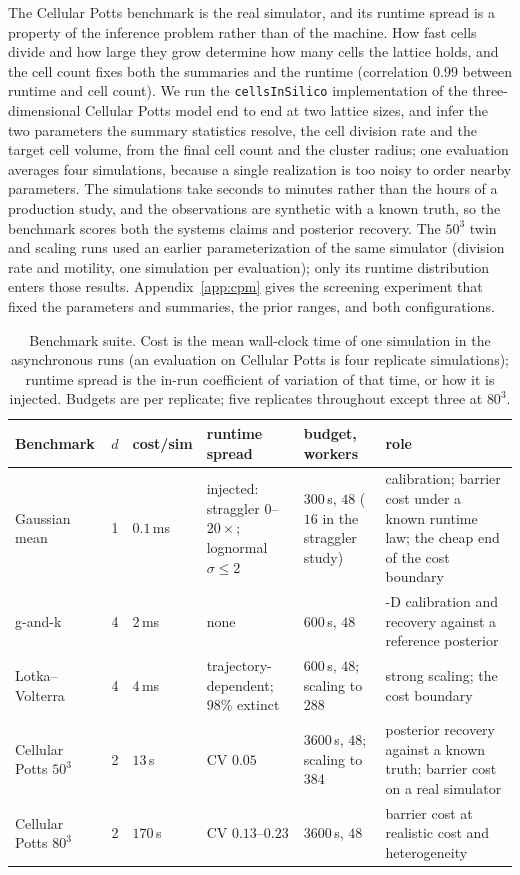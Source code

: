 \documentclass[10pt]{article}
\theoremstyle{plain}
\theoremstyle{definition}
\begin{document}
The Cellular Potts benchmark is the real simulator, and its runtime spread is a property of the inference problem rather than of the machine. How fast cells divide and how large they grow determine how many cells the lattice holds, and the cell count fixes both the summaries and the runtime (correlation $0.99$ between runtime and cell count). We run the \texttt{cellsInSilico} implementation \citep{berghoff2020cis} of the three-dimensional Cellular Potts model \citep{graner1992cpm} end to end at two lattice sizes, and infer the two parameters the summary statistics resolve, the cell division rate and the target cell volume, from the final cell count and the cluster radius; one evaluation averages four simulations, because a single realization is too noisy to order nearby parameters. The simulations take seconds to minutes rather than the hours of a production study, and the observations are synthetic with a known truth, so the benchmark scores both the systems claims and posterior recovery. The $50^3$ twin and scaling runs used an earlier parameterization of the same simulator (division rate and motility, one simulation per evaluation); only its runtime distribution enters those results. Appendix~\ref{app:cpm} gives the screening experiment that fixed the parameters and summaries, the prior ranges, and both configurations.
\begin{table}[t]
\caption{Benchmark suite. Cost is the mean wall-clock time of one simulation in the asynchronous runs (an evaluation on Cellular Potts is four replicate simulations); runtime spread is the in-run coefficient of variation of that time, or how it is injected. Budgets are per replicate; five replicates throughout except three at $80^3$.}\label{tab:benchmarks}
\centering
\footnotesize
\setlength{\tabcolsep}{3pt}
\begin{tabular}{@{}>{\raggedright\arraybackslash}p{}c>{\raggedright\arraybackslash}p{}>{\raggedright\arraybackslash}p{}>{\raggedright\arraybackslash}p{}>{\raggedright\arraybackslash}p{}@{}}
\toprule
Benchmark & $d$ & cost/sim & runtime spread & budget, workers & role \\
\midrule
Gaussian mean & 1 & $0.1$\,ms & injected: straggler $0$--$20\times$; lognormal $\sigma\le2$ & $300$\,s, $48$ ($16$ in the straggler study) & calibration; barrier cost under a known runtime law; the cheap end of the cost boundary \\
g-and-k & 4 & $2$\,ms & none & $600$\,s, $48$ & 4-D calibration and recovery against a reference posterior \\
Lotka--Volterra & 4 & $4$\,ms & trajectory-dependent; $98\%$ extinct & $600$\,s, $48$; scaling to $288$ & strong scaling; the cost boundary \\
Cellular Potts $50^3$ & 2 & $13$\,s & CV $0.05$ & $3600$\,s, $48$; scaling to $384$ & posterior recovery against a known truth; barrier cost on a real simulator \\
Cellular Potts $80^3$ & 2 & $170$\,s & CV $0.13$--$0.23$ & $3600$\,s, $48$ & barrier cost at realistic cost and heterogeneity \\
\bottomrule
\end{tabular}
\end{table}
\end{document}

